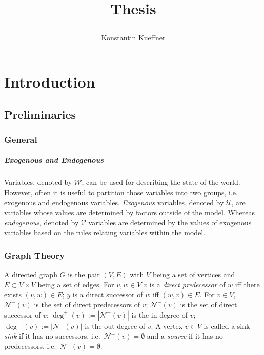 \documentclass[11pt,a4paper]{book}
\title{Thesis\\
\author{Konstantin Kueffner}}
\theoremstyle{definition}
\theoremstyle{definition}
\theoremstyle{definition}
\theoremstyle{remark}
\newcommand{\gtpred}{\mathcal{N}^+}
\newcommand{\gtsucc}{\mathcal{N}^-}
\newcommand{\gtdegpred}{\deg^+}
\newcommand{\gtdegsucc}{\deg^-}
\newcommand{\cvars}{\mathcal{W}}
\newcommand{\cenvars}{\mathcal{V}}
\newcommand{\cexvars}{\mathcal{U}}
\begin{document}
\maketitle

\tableofcontents

\chapter{Introduction}


\section{Preliminaries}

\subsection{General}
\label{subsec:graph_theory}
\paragraph{Exogenous and Endogenous} Variables, denoted by $\cvars$, can be used for describing the state of the world. However, often it is useful to partition those variables into two groups, i.e. exogenous and endogenous variables. \emph{Exogenous} variables, denoted by $\cexvars$, are variables whose values are determined by factors outside of the model. Whereas \emph{endogenous}, denoted by $\cenvars$ variables are determined by the values of exogenous variables based on the rules relating variables within the model. 


\subsection{Graph Theory}  
\label{subsec:graph_theory}
A directed graph $G$ is the pair $(V,E)$ with $V$ being a set of vertices and $E \subset V\times V$ being a set of edges. For $v,w \in V$ $v$ is a \emph{direct predecessor} of $w$  iff there exists $(v,w) \in E$; $y$ is a direct successor of $w$ iff $(w,v) \in E$. For $v \in V$, $\gtpred(v)$ is the set of direct predecessors of $v$; $\gtsucc(v)$ is the set of direct successor of $v$; $\gtdegpred(v):= |\gtpred(v)|$ is the in-degree of $v$; $\gtdegsucc(v):= |\gtsucc(v)|$ is the out-degree of $v$. A vertex $v\in V$ is called a sink \emph{sink} if it has no successors, i.e.\ $\gtsucc(v) = \emptyset$ and a \emph{source} if it has no predecessors, i.e.\ $\gtsucc(v) = \emptyset$.
\end{document}
